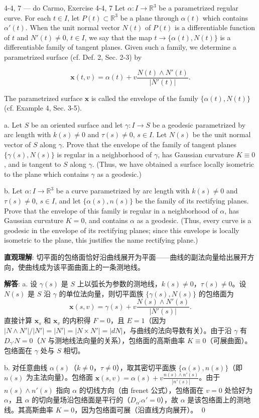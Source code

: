\begin{exercise}{4-4, 7 — do Carmo, Exercise 4-4, 7}
Let $\alpha: I \to \mathbb{R}^3$ be a parametrized regular curve. For each $t \in I$, let $P(t) \subset \mathbb{R}^3$ be a plane through $\alpha(t)$ which contains $\alpha'(t)$. When the unit normal vector $N(t)$ of $P(t)$ is a differentiable function of $t$ and $N'(t) \neq 0$, $t \in I$, we say that the map $t \to \{\alpha(t), N(t)\}$ is a differentiable family of tangent planes. Given such a family, we determine a parametrized surface (cf. Def. 2, Sec. 2-3) by

\[
\mathbf{x}(t, v) = \alpha(t) + v \frac{N(t) \wedge N'(t)}{|N'(t)|}.
\]

The parametrized surface $\mathbf{x}$ is called the envelope of the family $\{\alpha(t), N(t)\}$ (cf. Example 4, Sec. 3-5).

a. Let $S$ be an oriented surface and let $\gamma \colon I \to S$ be a geodesic parametrized by arc length with $k(s) \neq 0$ and $\tau(s) \neq 0$, $s \in I$. Let $N(s)$ be the unit normal vector of $S$ along $\gamma$. Prove that the envelope of the family of tangent planes $\{\gamma(s), N(s)\}$ is regular in a neighborhood of $\gamma$, has Gaussian curvature $K \equiv 0$, and is tangent to $S$ along $\gamma$. (Thus, we have obtained a surface locally isometric to the plane which contains $\gamma$ as a geodesic.)

b. Let $\alpha \colon I \to \mathbb{R}^3$ be a curve parametrized by arc length with $k(s) \neq 0$ and $\tau(s) \neq 0$, $s \in I$, and let $\{\alpha(s), n(s)\}$ be the family of its rectifying planes. Prove that the envelope of this family is regular in a neighborhood of $\alpha$, has Gaussian curvature $K = 0$, and contains $\alpha$ as a geodesic. (Thus, every curve is a geodesic in the envelope of its rectifying planes; since this envelope is locally isometric to the plane, this justifies the name rectifying plane.)
\end{exercise}

\begin{solution}
\textbf{直观理解}: 切平面的包络面恰好沿曲线展开为平面——曲线的副法向量给出展开方向，使曲线成为该平面曲面上的一条测地线。

\textbf{解答}: a. 设 $\gamma(s)$ 是 $S$ 上以弧长为参数的测地线，$k(s)\neq 0$，$\tau(s)\neq 0$。设 $N(s)$ 是 $S$ 沿 $\gamma$ 的单位法向量，则切平面族 $\{\gamma(s),N(s)\}$ 的包络面为
\[
\mathbf{x}(s,v) = \gamma(s) + v\frac{N(s)\wedge N'(s)}{|N'(s)|}.
\]
直接计算 $\mathbf{x}_s$ 和 $\mathbf{x}_v$ 的内积得 $F=0$，且 $E=1$（因为 $|N\wedge N'|/|N'|=|N'|=|N\times N'|=|dN|$，与曲线的法向导数有关）。由于沿 $\gamma$ 有 $D_{\gamma'}N = 0$（$N$ 与测地线法向量的关系），包络面的高斯曲率 $K\equiv 0$（可展曲面）。包络面在 $\gamma$ 处与 $S$ 相切。

b. 对任意曲线 $\alpha(s)$（$k\neq 0$，$\tau\neq 0$），取其密切平面族 $\{\alpha(s),n(s)\}$（即 $n(s)$ 为主法向量）。包络面 $\mathbf{x}(s,v) = \alpha(s)+v\frac{n(s)\wedge n'(s)}{|n'(s)|}$。由于 $n(s)\wedge n'(s)$ 指向 $\alpha$ 的切线方向（由 frenet 公式），包络面在 $v=0$ 处恰好为 $\alpha$，且 $\alpha$ 的切向量场沿包络面是平行的（$D_{\alpha'}\alpha'=0$），故 $\alpha$ 是该包络面上的测地线。其高斯曲率 $K=0$，因为包络面可展（沿直线方向展开）。
\qed
\end{solution}

